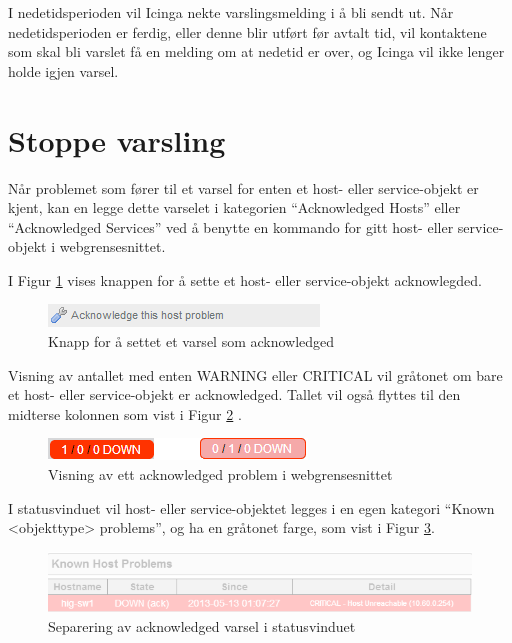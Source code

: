 I nedetidsperioden vil Icinga nekte varslingsmelding i å bli sendt ut. Når nedetidsperioden er ferdig, eller denne blir utført før avtalt tid, vil kontaktene som skal bli varslet få en melding om at nedetid er over, og Icinga vil ikke lenger holde igjen varsel.

\section{Stoppe varsling}
Når problemet som fører til et varsel for enten et host- eller service-objekt er kjent, kan en legge dette varselet i kategorien ``Acknowledged Hosts'' eller
``Acknowledged Services'' ved å benytte en kommando for gitt host- eller service-objekt i webgrensesnittet.

I Figur \ref{ackbutton} vises knappen for å sette et host- eller service-objekt acknowlegded.

	\begin{figure}[H]
	    \centering
	    \includegraphics{img/ack_button}
	    \caption{Knapp for å settet et varsel som acknowledged}
	    \label{ackbutton}
	\end{figure}

Visning av antallet med enten WARNING eller CRITICAL vil gråtonet om bare et host- eller service-objekt er acknowledged. Tallet vil også flyttes til den midterse kolonnen som vist i Figur \ref{ackcombined} .

	\begin{figure}[H]
	    \centering
	    \includegraphics{img/ack_combined}
	    \caption{Visning av ett acknowledged problem i webgrensesnittet}
	    \label{ackcombined}
	\end{figure}

I statusvinduet vil host- eller service-objektet legges i en egen kategori ``Known <objekttype> problems'', og ha en gråtonet farge, som vist i Figur \ref{ackstatusvindu}.

	\begin{figure}[H]
	    \centering
	    \includegraphics{img/ack_statusvindu}
	    \caption{Separering av acknowledged varsel i statusvinduet}
	    \label{ackstatusvindu}
	\end{figure}


